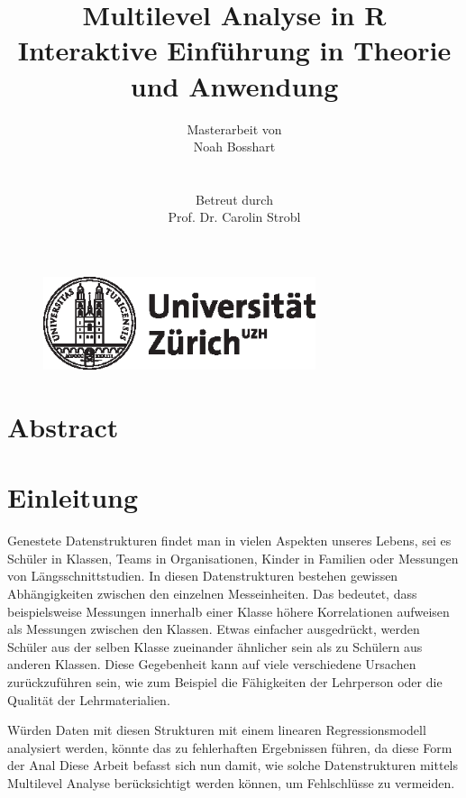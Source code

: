 \documentclass[12pt]{article}\usepackage[]{graphicx}\usepackage[]{color}
\title{Multilevel Analyse in R \\ \large Interaktive Einführung in Theorie und Anwendung}
\author{Masterarbeit von \\ Noah Bosshart \\ \\ \\ Betreut durch \\ Prof. Dr. Carolin Strobl}
\begin{document}
\begin{figure}[t]
  \centering
  \includegraphics[width = 8cm]{uzh_logo}
\end{figure}

\maketitle

\newpage
\tableofcontents

\newpage
\section{Abstract}

\newpage

\section{Einleitung}
Genestete Datenstrukturen findet man in vielen Aspekten unseres Lebens, sei es Schüler in Klassen, Teams in Organisationen, Kinder in Familien oder Messungen von Längsschnittstudien. In diesen Datenstrukturen bestehen gewissen Abhängigkeiten zwischen den einzelnen Messeinheiten. Das bedeutet, dass beispielsweise Messungen innerhalb einer Klasse höhere Korrelationen aufweisen als Messungen zwischen den Klassen. Etwas einfacher ausgedrückt, werden Schüler aus der selben Klasse zueinander ähnlicher sein als zu Schülern aus anderen Klassen. Diese Gegebenheit kann auf viele verschiedene Ursachen zurückzuführen sein, wie zum Beispiel die Fähigkeiten der Lehrperson oder die Qualität der Lehrmaterialien. 


Würden Daten mit diesen Strukturen mit einem linearen Regressionsmodell analysiert werden, könnte das zu fehlerhaften Ergebnissen führen, da diese Form der Anal Diese Arbeit befasst sich nun damit, wie solche Datenstrukturen  mittels Multilevel Analyse berücksichtigt werden können, um Fehlschlüsse zu vermeiden.
\end{document}
